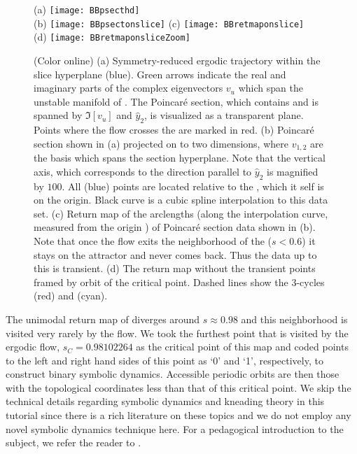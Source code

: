 \documentclass[aip,cha,
reprint,
secnumarabic,
nofootinbib, tightenlines,
nobibnotes, showkeys, showpacs,
superscriptaddress,
]{revtex4-1}
\begin{document}
\begin{figure}
\centering
  (a) \texttt{[image: BBpsecthd]} \\
  (b) \texttt{[image: BBpsectonslice]}
  (c) \texttt{[image: BBretmaponslice]} \\
  (d) \texttt{[image: BBretmaponsliceZoom]}
\caption{(Color online)
         (a) Symmetry-reduced ergodic trajectory within the slice hyperplane 
             (blue). Green arrows indicate the real and imaginary parts of the 
             complex eigenvectors $v_u$ which span the unstable manifold of 
             \REQV{}{}. The Poincar\'e section, which contains \REQV{}{} and 
             is spanned by $\Im[v_u]$ and $\hat{y}_2$, is visualized as a 
             transparent plane. Points where the flow crosses the are marked 
             in red.
		 (b) Poincar\'e section shown in (a) projected on to two dimensions, 
		 	 where $v_{1,2}$ are the basis which spans the section hyperplane.
		 	 Note that the vertical axis, which corresponds to the direction 
		 	 parallel to $\hat{y}_2$ is magnified by $100$. All (blue) points 
		 	 are located relative to the \REQV{}{}, which it self is on the origin.
		 	 Black curve is a cubic spline interpolation to this data set.		  	
		 (c) Return map of the arclengths (along the interpolation curve, measured
		     from the origin \REQV{}{}) of Poincar\'e section data shown in (b). 
			 Note that once the flow exits the neighborhood of the \REQV{}{} 
			 ($s < 0.6$) it stays on the attractor and never comes back. Thus the data 
			 up to this is transient.
		 (d) The return map without the transient points framed by orbit of the 
		     critical point. Dashed lines show the 3-cycles  (red) and 
		      (cyan).}
\label{fig:psectandretmap}
\end{figure}

The unimodal return map of  diverges 
around $s \approx 0.98$ and this neighborhood is visited very 
rarely by the flow. We took the furthest point that is visited by 
the ergodic flow, $s_C=0.98102264$ as the critical point of this 
map and coded points to the left and right hand sides of this 
point as `0' and `1', respectively, to construct binary symbolic 
dynamics. Accessible periodic orbits are then those with the 
topological coordinates less than that of this critical point. We 
skip the technical details regarding symbolic dynamics and 
kneading theory in this tutorial since there is a rich literature 
on these topics and we do not employ any novel symbolic dynamics 
technique here. For a pedagogical introduction to the subject, we 
refer the reader to .
\end{document}

